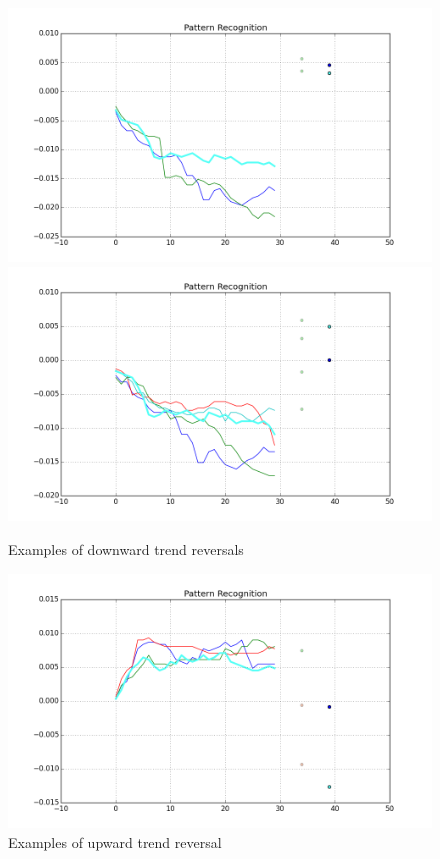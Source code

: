 \documentclass{article}
\begin{document}
\begin{figure}[h!]
\begin{center}
        \includegraphics[scale=0.3]{figure_1}
        \includegraphics[scale=0.3]{figure_2}
        \caption{Examples of downward trend reversals}
\end{center}
\end{figure}

\begin{figure}[h!]
\begin{center}
        \includegraphics[scale=0.3]{figure_3}
        \caption{Examples of upward trend reversal}
\end{center}
\end{figure}
 
\end{document}

